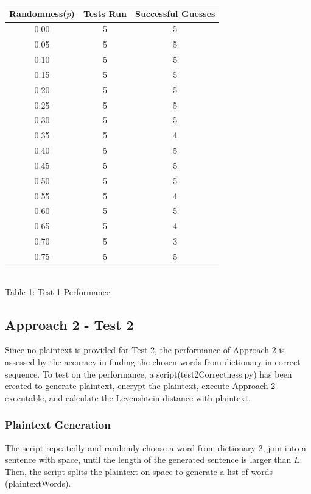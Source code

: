 \documentclass[12pt]{article}
\begin{document}
\begin{center}
\begin{tabular}{|c|c|c|} 
 \hline
 Randomness($p$) & Tests Run& Successful Guesses \\ [0.5ex] 
 \hline\hline
 0.00 & 5 & 5 \\ 
 \hline
 0.05 & 5 & 5 \\
 \hline
 0.10 & 5 & 5 \\
 \hline
 0.15 & 5 & 5 \\
 \hline
 0.20 & 5 & 5 \\
 \hline
 0.25 & 5 & 5 \\
 \hline
 0.30 & 5 & 5 \\
 \hline
 0.35 & 5 & 4 \\
 \hline
 0.40 & 5 & 5 \\
 \hline
 0.45 & 5 & 5 \\
 \hline
 0.50 & 5 & 5 \\
 \hline
 0.55 & 5 & 4 \\
 \hline
 0.60 & 5 & 5 \\
 \hline
 0.65 & 5 & 4 \\
 \hline
 0.70 & 5 & 3 \\
 \hline
 0.75 & 5 & 5 \\
 \hline
\end{tabular} \\
    \vspace{0.15in}
Table 1: Test 1 Performance
\end{center}

\subsection{Approach 2 - Test 2}
Since no plaintext is provided for Test 2, the performance of Approach 2 is assessed by the accuracy in finding the chosen words from dictionary in correct sequence. To test on the performance, a script(test2Correctness.py) has been created to generate plaintext, encrypt the plaintext, execute Approach 2 executable, and calculate the Levenshtein distance with plaintext.

\subsubsection{Plaintext Generation}
The script repeatedly and randomly choose a word from dictionary $2$, join into a sentence with space, until the length of the generated sentence is larger than $L$. Then, the script splits the plaintext on space to generate a list of words (plaintextWords).
\end{document}
